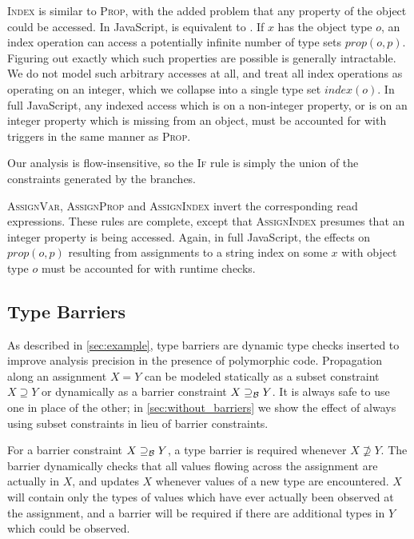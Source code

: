 \textsc{Index} is similar to \textsc{Prop}, with the added problem that any
property of the object could be accessed.  In JavaScript,  is
equivalent to . If $x$ has the object type $o$, an index operation
can access a potentially infinite number of type sets $\mathit{prop}(o,p)$.
Figuring out exactly which such properties are possible is generally
intractable. We do not model such arbitrary accesses at all, and treat
all index operations as operating on an integer,
 which we collapse into a single type set
$\mathit{index}(o)$.  In full JavaScript, any indexed access which is on a
non-integer property, or is on an integer property which is missing from an
object, must be accounted for with triggers in the same manner as
\textsc{Prop}.

Our analysis is flow-insensitive, so the \textsc{If} rule is simply the union
of the constraints generated by the branches.

\textsc{AssignVar}, \textsc{AssignProp} and \textsc{AssignIndex} invert the
corresponding read expressions.  These rules are complete, except that
\textsc{AssignIndex} presumes that an integer property is being accessed.
Again, in full JavaScript, the effects on $\mathit{prop}(o,p)$ resulting from
assignments to a string index  on some $x$ with object type $o$
must be accounted for with runtime checks.


\subsection{Type Barriers}
\label{sec:analysis-barriers}

As described in \Section\ref{sec:example}, type barriers are dynamic type checks
inserted to improve analysis precision in the presence
of polymorphic code.
Propagation along an assignment $X = Y$ can be modeled
statically as a subset
constraint $X \supseteq Y$ or dynamically as a barrier constraint
$X \supseteq_\mathcal{B} Y$.
It is always safe to use one in place of the other; in \Section\ref{sec:without_barriers}
we show the effect of always using subset constraints in lieu of
barrier constraints.

For a barrier constraint $X \supseteq_\mathcal{B} Y$, a type barrier is required whenever
$X \not\supseteq Y$. The barrier dynamically checks that all values
flowing across the assignment are actually in $X$, and updates $X$ whenever
values of a new type are encountered.
$X$ will contain only the types of values which
have ever actually been observed at the assignment, and a barrier will be
required if there are additional types in $Y$ which could be observed.

